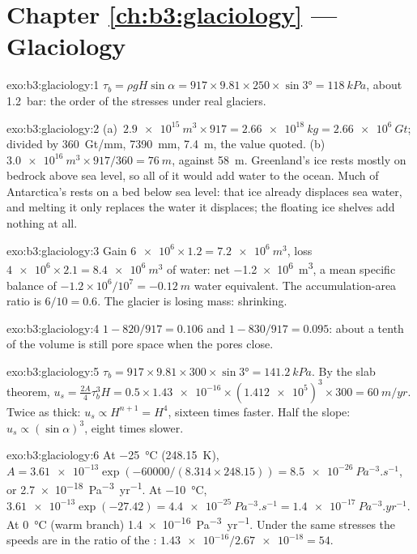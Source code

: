 \section*{Chapter \ref{ch:b3:glaciology} --- Glaciology}

\begin{solution}{exo:b3:glaciology:1}
$\tau_b = \rho gH\sin\alpha = 917\times9.81\times250\times\sin\ang{3} =
\qty{118}{kPa}$, about \qty{1.2}{bar}: the order of the stresses under real
glaciers.
\end{solution}

\begin{solution}{exo:b3:glaciology:2}
(a)~$\qty{2.9e15}{m^3}\times917 = \qty{2.66e18}{kg} = \qty{2.66e6}{Gt}$;
divided by \qty{360}{Gt/mm}, \qty{7390}{mm}, \qty{7.4}{m}, the value quoted.
(b)~$\qty{3.0e16}{m^3}\times917/360 = \qty{76}{m}$, against \qty{58}{m}.
Greenland's ice rests mostly on bedrock above sea level, so all of it would
add water to the ocean. Much of Antarctica's rests on a bed below sea
level: that ice already displaces sea water, and melting it only replaces
the water it displaces; the floating ice shelves add nothing at all.
\end{solution}

\begin{solution}{exo:b3:glaciology:3}
Gain $\num{6e6}\times1.2 = \qty{7.2e6}{m^3}$, loss $\num{4e6}\times2.1 =
\qty{8.4e6}{m^3}$ of water: net \qty{-1.2e6}{m^3}, a mean specific balance
of $-1.2\times10^6/10^7 = \qty{-0.12}{m}$ water equivalent. The
accumulation-area ratio is $6/10 = 0.6$. The glacier is losing mass:
shrinking.
\end{solution}

\begin{solution}{exo:b3:glaciology:4}
$1 - 820/917 = \num{0.106}$ and $1 - 830/917 = \num{0.095}$: about a tenth
of the volume is still pore space when the pores close.
\end{solution}

\begin{solution}{exo:b3:glaciology:5}
$\tau_b = 917\times9.81\times300\times\sin\ang{3} = \qty{141.2}{kPa}$. By
the slab theorem, $u_s = \tfrac{2A}{4}\tau_b^3H = 0.5\times\num{1.43e-16}
\times(\num{1.412e5})^3\times300 = \qty{60}{m/yr}$. Twice as thick: $u_s
\propto H^{n+1} = H^4$, sixteen times faster. Half the slope: $u_s \propto
(\sin\alpha)^3$, eight times slower.
\end{solution}

\begin{solution}{exo:b3:glaciology:6}
At \qty{-25}{\celsius} (\qty{248.15}{K}), $A = \num{3.61e-13}\exp(-60000/
(8.314\times248.15)) = \qty{8.5e-26}{Pa^{-3}.s^{-1}}$, or
\qty{2.7e-18}{Pa^{-3}.yr^{-1}}. At \qty{-10}{\celsius}, $\num{3.61e-13}
\exp(-27.42) = \qty{4.4e-25}{Pa^{-3}.s^{-1}} = \qty{1.4e-17}{Pa^{-3}.yr^{-1}}$.
At \qty{0}{\celsius} (warm branch) \qty{1.4e-16}{Pa^{-3}.yr^{-1}}. Under
the same stresses the speeds are in the ratio of the :
$\num{1.43e-16}/\num{2.67e-18} = 54$.
\end{solution}

